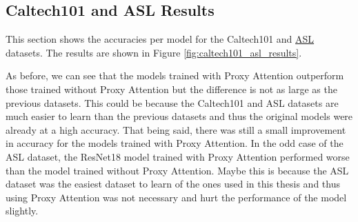 \documentclass[a4paper,11pt,openright]{book}
\begin{document}
\subsection{Caltech101 and ASL Results}
This section shows the accuracies per model for the Caltech101 \cite{liCaltech101} and \href{https://www.kaggle.com/datasets/grassknoted/asl-alphabet}{ASL} datasets. The results are shown in Figure \ref{fig:caltech101_asl_results}.

As before, we can see that the models trained with Proxy Attention outperform those trained without Proxy Attention but the difference is not as large as the previous datasets. This could be because the Caltech101 and ASL datasets are much easier to learn than the previous datasets and thus the original models were already at a high accuracy. That being said, there was still a small improvement in accuracy for the models trained with Proxy Attention. In the odd case of the ASL dataset, the ResNet18 model trained with Proxy Attention performed worse than the model trained without Proxy Attention. Maybe this is because the ASL dataset was the easiest dataset to learn of the ones used in this thesis and thus using Proxy Attention was not necessary and hurt the performance of the model slightly.
\end{document}

